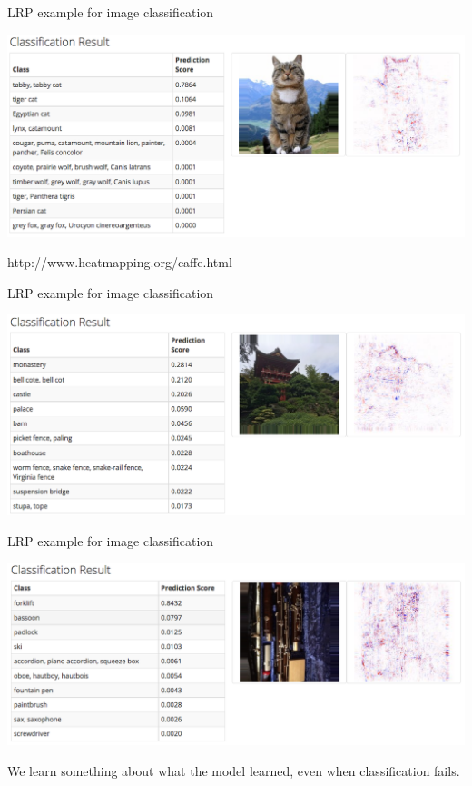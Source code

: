 \documentclass[xetex,compress]{beamer}
\begin{document}
\begin{frame}{LRP example for image classification}
  \begin{center}
    \includegraphics[width=1.00\textwidth]{./figures/lrp_example_1.png}
  \end{center}
  http://www.heatmapping.org/caffe.html
\end{frame}

\begin{frame}{LRP example for image classification}
  \begin{center}
    \includegraphics[width=1.00\textwidth]{./figures/lrp_example_2.png}
  \end{center}
\end{frame}

\begin{frame}{LRP example for image classification}
  \begin{center}
    \includegraphics[width=1.00\textwidth]{./figures/lrp_example_3.png}
  \end{center}
  We learn something about what the model learned, even when classification fails.
\end{frame}
\end{document}
